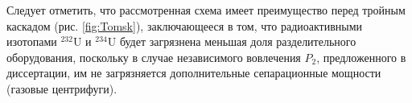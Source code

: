 Следует отметить, что рассмотренная схема имеет преимущество перед тройным каскадом (рис. \ref{fig:Tomsk}), заключающееся в том, что радиоактивными изотопами $^{232}$U и $^{234}$U будет загрязнена меньшая доля разделительного оборудования, поскольку в случае независимого вовлечения $P_2$, предложенного в диссертации, им не загрязняется дополнительные сепарационные мощности (газовые центрифуги).

\clearpage